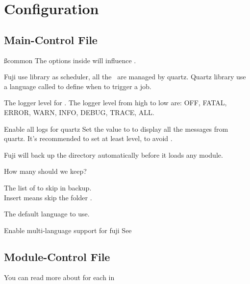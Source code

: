 \chapter{Configuration}\label{ch:configuration}


\section{Main-Control File}

\ss{common}
The  options inside  will influence .

Fuji use  library as scheduler, all the~ are managed by quartz.
Quartz library use a language called  to define when to trigger a job.

The logger level for .
The logger level from high to low are: OFF, FATAL, ERROR, WARN, INFO, DEBUG, TRACE, ALL.

\begin{example}{Enable all logs for quartz}
    Set the value to  to display all the messages from quartz.
    It's recommended to set at least  level, to avoid .
\end{example}

Fuji will back up the  directory automatically before it loads any module.

How many  should we keep?

The list of  to skip in backup. \\
Insert  means skip the folder .

The default language to use.

\begin{tips}{Enable multi-language support for fuji}
    See~
\end{tips}


\clearpage
\section{Module-Control File}
You can read more about  for each  in 